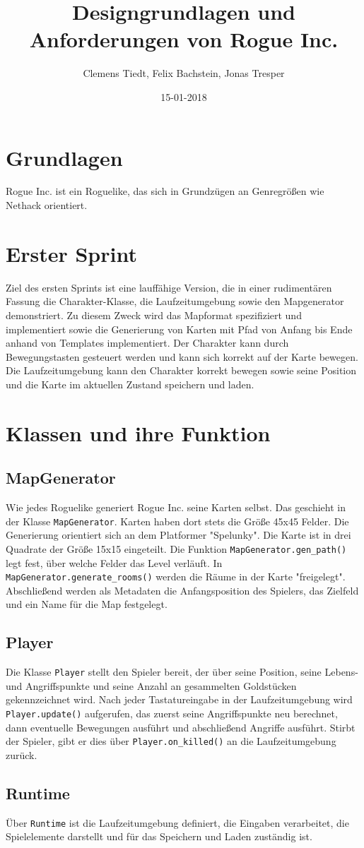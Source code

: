 \documentclass{article}
\title{Designgrundlagen und Anforderungen von Rogue Inc.}
\author{Clemens Tiedt, Felix Bachstein, Jonas Tresper}
\date{15-01-2018}
\begin{document}
\maketitle

\section{Grundlagen}
Rogue Inc. ist ein Roguelike, das sich in Grundzügen an Genregrößen wie Nethack orientiert. 

\section{Erster Sprint}
Ziel des ersten Sprints ist eine lauffähige Version, die in einer rudimentären Fassung die Charakter-Klasse, die Laufzeitumgebung sowie den Mapgenerator demonstriert.
Zu diesem Zweck wird das Mapformat spezifiziert und implementiert sowie die Generierung von Karten mit Pfad von Anfang bis Ende anhand von Templates implementiert.
Der Charakter kann durch Bewegungstasten gesteuert werden und kann sich korrekt auf der Karte bewegen. 
Die Laufzeitumgebung kann den Charakter korrekt bewegen sowie seine Position und die Karte im aktuellen Zustand speichern und laden.

\section{Klassen und ihre Funktion}
\subsection{MapGenerator}
Wie jedes Roguelike generiert Rogue Inc. seine Karten selbst. Das geschieht in der Klasse \verb|MapGenerator|. Karten haben dort stets die Größe 45x45 Felder. Die Generierung orientiert sich an dem Platformer "Spelunky". Die Karte ist in drei Quadrate der Größe 15x15 eingeteilt. Die Funktion \verb|MapGenerator.gen_path()| legt fest, über welche Felder das Level verläuft. In \verb|MapGenerator.generate_rooms()| werden die Räume in der Karte "freigelegt". Abschließend werden als Metadaten die Anfangsposition des Spielers, das Zielfeld und ein Name für die Map festgelegt.

\subsection{Player}
Die Klasse \verb|Player| stellt den Spieler bereit, der über seine Position, seine Lebens- und Angriffspunkte und seine Anzahl an gesammelten Goldstücken gekennzeichnet wird. Nach jeder Tastatureingabe in der Laufzeitumgebung wird \verb|Player.update()| aufgerufen, das zuerst seine Angriffspunkte neu berechnet, dann eventuelle Bewegungen ausführt und abschließend Angriffe ausführt. Stirbt der Spieler, gibt er dies über \verb|Player.on_killed()| an die Laufzeitumgebung zurück.

\subsection{Runtime}
Über \verb|Runtime| ist die Laufzeitumgebung definiert, die Eingaben verarbeitet, die Spielelemente darstellt und für das Speichern und Laden zuständig ist.
\end{document}

